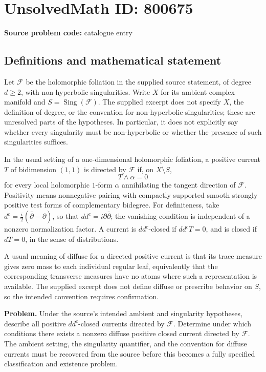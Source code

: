 \documentclass[11pt]{article}
\begin{document}
\section*{UnsolvedMath ID: 800675}
\textbf{Source problem code:} catalogue entry
\subsection{Definitions and mathematical statement}
Let \(\mathscr F\) be the holomorphic foliation in the supplied source statement, of degree \(d\geq 2\), with non-hyperbolic singularities. Write \(X\) for its ambient complex manifold and \(S=\operatorname{Sing}(\mathscr F)\). The supplied excerpt does not specify \(X\), the definition of degree, or the convention for non-hyperbolic singularities; these are unresolved parts of the hypotheses. In particular, it does not explicitly say whether every singularity must be non-hyperbolic or whether the presence of such singularities suffices.

In the usual setting of a one-dimensional holomorphic foliation, a positive current \(T\) of bidimension \((1,1)\) is directed by \(\mathscr F\) if, on \(X\setminus S\),
\[
T\wedge\alpha=0
\]
for every local holomorphic \(1\)-form \(\alpha\) annihilating the tangent direction of \(\mathscr F\). Positivity means nonnegative pairing with compactly supported smooth strongly positive test forms of complementary bidegree. For definiteness, take \(d^c=\frac{i}{2}(\bar\partial-\partial)\), so that \(dd^c=i\partial\bar\partial\); the vanishing condition is independent of a nonzero normalization factor. A current is \(dd^c\)-closed if \(dd^cT=0\), and is closed if \(dT=0\), in the sense of distributions.

A usual meaning of diffuse for a directed positive current is that its trace measure gives zero mass to each individual regular leaf, equivalently that the corresponding transverse measures have no atoms where such a representation is available. The supplied excerpt does not define diffuse or prescribe behavior on \(S\), so the intended convention requires confirmation.

\textbf{Problem.} Under the source's intended ambient and singularity hypotheses, describe all positive \(dd^c\)-closed currents directed by \(\mathscr F\). Determine under which conditions there exists a nonzero diffuse positive closed current directed by \(\mathscr F\). The ambient setting, the singularity quantifier, and the convention for diffuse currents must be recovered from the source before this becomes a fully specified classification and existence problem.
\end{document}
